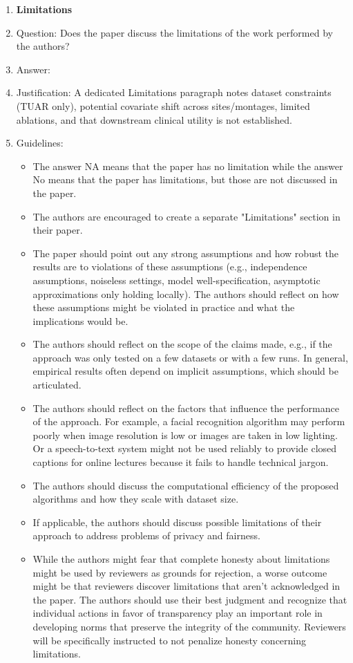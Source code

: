 \documentclass{article}
\begin{document}
\begin{enumerate}
\item {\bf Limitations}
    \item[] Question: Does the paper discuss the limitations of the work performed by the authors?
    \item[] Answer: \answerYes{}
    \item[] Justification: A dedicated Limitations paragraph notes dataset constraints (TUAR only), potential covariate shift across sites/montages, limited ablations, and that downstream clinical utility is not established.
    \item[] Guidelines:
    \begin{itemize}
        \item The answer NA means that the paper has no limitation while the answer No means that the paper has limitations, but those are not discussed in the paper. 
        \item The authors are encouraged to create a separate "Limitations" section in their paper.
        \item The paper should point out any strong assumptions and how robust the results are to violations of these assumptions (e.g., independence assumptions, noiseless settings, model well-specification, asymptotic approximations only holding locally). The authors should reflect on how these assumptions might be violated in practice and what the implications would be.
        \item The authors should reflect on the scope of the claims made, e.g., if the approach was only tested on a few datasets or with a few runs. In general, empirical results often depend on implicit assumptions, which should be articulated.
        \item The authors should reflect on the factors that influence the performance of the approach. For example, a facial recognition algorithm may perform poorly when image resolution is low or images are taken in low lighting. Or a speech-to-text system might not be used reliably to provide closed captions for online lectures because it fails to handle technical jargon.
        \item The authors should discuss the computational efficiency of the proposed algorithms and how they scale with dataset size.
        \item If applicable, the authors should discuss possible limitations of their approach to address problems of privacy and fairness.
        \item While the authors might fear that complete honesty about limitations might be used by reviewers as grounds for rejection, a worse outcome might be that reviewers discover limitations that aren't acknowledged in the paper. The authors should use their best judgment and recognize that individual actions in favor of transparency play an important role in developing norms that preserve the integrity of the community. Reviewers will be specifically instructed to not penalize honesty concerning limitations.
    \end{itemize}


\end{enumerate}
\end{document}

